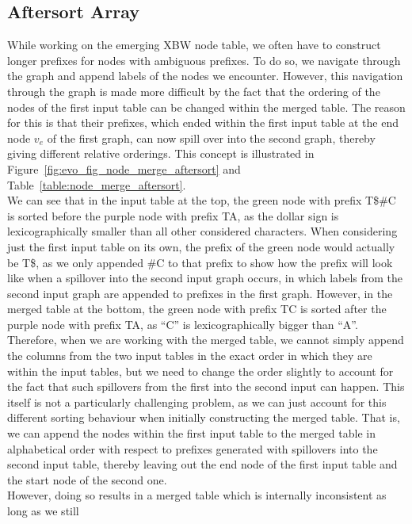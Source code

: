 \documentclass[a4paper,12pt,twoside,BCOR=10mm]{scrbook}
\begin{document}
\subsection{Aftersort Array}

While working on the emerging XBW node table, we often have to construct longer prefixes for nodes
with ambiguous prefixes. To do so, we navigate through the graph and append labels of the nodes we encounter.
However, this navigation through the graph is made more difficult by the fact that the ordering
of the nodes of the first input table can be changed within the merged table.
The reason for this is that their prefixes, which ended within the first input table at the
end node $ v_e $ of the first graph, can now spill over into the second graph,
thereby giving different relative orderings.
This concept is illustrated in Figure~\ref{fig:evo_fig_node_merge_aftersort} and Table~\ref{table:node_merge_aftersort}. \\
We can see that in the input table at the top, the green node with prefix T\$$\#$C is sorted
before the purple node with prefix TA,
as the dollar sign is lexicographically smaller
than all other considered characters.
When considering just the first input table on its own, the prefix of the green node would actually be T\$,
as we only appended $\#$C to that prefix to show
how the prefix will look like when a spillover into the second input graph occurs, in which labels from the
second input graph are appended to prefixes in the first graph.
However, in the merged table at the bottom, the green node with prefix TC is sorted after the purple node with prefix TA,
as “C” is lexicographically bigger than “A”. \\
Therefore, when we are working with the merged table, we cannot simply append the columns from the two input
tables in the exact order in which they are within the input tables, but we need to change the order slightly
to account for the fact that such spillovers from the first into the second input can happen.
This itself is not a particularly challenging problem, as we can just account for this different sorting
behaviour when initially constructing the merged table. That is, we can append the nodes within the 
first input table to the merged table in alphabetical order with respect to prefixes 
generated with spillovers 
into the second input table, thereby leaving out the end node of the first input table 
and the start node of the second one. \\
However, doing so results in a merged table which is internally inconsistent as long as we still
\end{document}
